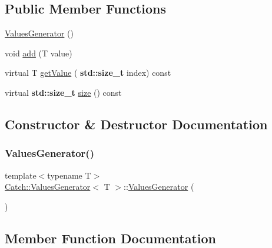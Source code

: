 \subsection*{Public Member Functions}
\begin{DoxyCompactItemize}
\item 
\hyperlink{class_catch_1_1_values_generator_a36cd3d75afb1f5502400c3ad7cae7a5e}{Values\+Generator} ()
\item 
void \hyperlink{class_catch_1_1_values_generator_a8412c8ce5d9d4fc6ff06d5246d56d538}{add} (T value)
\item 
virtual T \hyperlink{class_catch_1_1_values_generator_a9674c8b70d562d2d68154de92dd1810a}{get\+Value} (\textbf{ std\+::size\+\_\+t} index) const
\item 
virtual \textbf{ std\+::size\+\_\+t} \hyperlink{class_catch_1_1_values_generator_a9aa5b140ee502975cf35115e534ab771}{size} () const
\end{DoxyCompactItemize}


\subsection{Constructor \& Destructor Documentation}
\mbox{\label{class_catch_1_1_values_generator_a36cd3d75afb1f5502400c3ad7cae7a5e}} 
\subsubsection{\texorpdfstring{Values\+Generator()}{ValuesGenerator()}}
{\footnotesize\ttfamily template$<$typename T$>$ \\
\hyperlink{class_catch_1_1_values_generator}{Catch\+::\+Values\+Generator}$<$ T $>$\+::\hyperlink{class_catch_1_1_values_generator}{Values\+Generator} (\begin{DoxyParamCaption}{ }\end{DoxyParamCaption})\hspace{0.3cm}{\ttfamily [inline]}}



\subsection{Member Function Documentation}
\mbox{\label{class_catch_1_1_values_generator_a8412c8ce5d9d4fc6ff06d5246d56d538}} 
